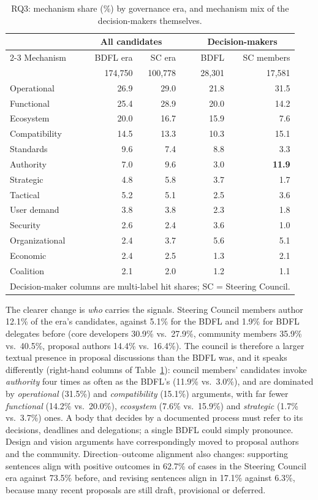 \documentclass[sigconf,screen]{acmart}
\begin{document}
\begin{table}[t]
\caption{RQ3: mechanism share (\%) by governance era, and mechanism mix of the decision-makers themselves.}
\label{tab:rq3}
\begin{tabular}{lrrcrr}
\toprule
 & \multicolumn{2}{c}{All candidates} & & \multicolumn{2}{c}{Decision-makers} \\
\cmidrule{2-3}\cmidrule{5-6}
Mechanism & BDFL era & SC era & & BDFL & SC members \\
 & 174,750 & 100,778 & & 28,301 & 17,581 \\
\midrule
Operational & 26.9 & 29.0 & & 21.8 & 31.5 \\
Functional & 25.4 & 28.9 & & 20.0 & 14.2 \\
Ecosystem & 20.0 & 16.7 & & 15.9 & 7.6 \\
Compatibility & 14.5 & 13.3 & & 10.3 & 15.1 \\
Standards & 9.6 & 7.4 & & 8.8 & 3.3 \\
Authority & 7.0 & 9.6 & & 3.0 & \textbf{11.9} \\
Strategic & 4.8 & 5.8 & & 3.7 & 1.7 \\
Tactical & 5.2 & 5.1 & & 2.5 & 3.6 \\
User demand & 3.8 & 3.8 & & 2.3 & 1.8 \\
Security & 2.6 & 2.4 & & 3.6 & 1.0 \\
Organizational & 2.4 & 3.7 & & 5.6 & 5.1 \\
Economic & 2.4 & 2.5 & & 1.3 & 2.1 \\
Coalition & 2.1 & 2.0 & & 1.2 & 1.1 \\
\bottomrule
\multicolumn{6}{l}{\footnotesize Decision-maker columns are multi-label hit shares; SC = Steering Council.}
\end{tabular}
\end{table}

The clearer change is \emph{who} carries the signals. Steering Council members author 12.1\% of the era's candidates, against 5.1\% for the BDFL and 1.9\% for BDFL delegates before (core developers 30.9\% vs.\ 27.9\%, community members 35.9\% vs.\ 40.5\%, proposal authors 14.4\% vs.\ 16.4\%). The council is therefore a larger textual presence in proposal discussions than the BDFL was, and it speaks differently (right-hand columns of Table~\ref{tab:rq3}): council members' candidates invoke \emph{authority} four times as often as the BDFL's (11.9\% vs.\ 3.0\%), and are dominated by \emph{operational} (31.5\%) and \emph{compatibility} (15.1\%) arguments, with far fewer \emph{functional} (14.2\% vs.\ 20.0\%), \emph{ecosystem} (7.6\% vs.\ 15.9\%) and \emph{strategic} (1.7\% vs.\ 3.7\%) ones. A body that decides by a documented process must refer to its decisions, deadlines and delegations; a single BDFL could simply pronounce. Design and vision arguments have correspondingly moved to proposal authors and the community. Direction--outcome alignment also changes: supporting sentences align with positive outcomes in 62.7\% of cases in the Steering Council era against 73.5\% before, and revising sentences align in 17.1\% against 6.3\%, because many recent proposals are still draft, provisional or deferred.
\end{document}

